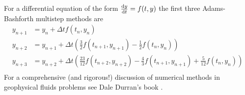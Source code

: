 \documentclass[a4paper]{tufte-handout}
\begin{document}
  For a differential equation of the form $ \frac{\operatorname{d}\!{} y}{\operatorname{d}\!{t}} = f(t, y) $ the
  first three Adams-Bashforth multistep methods are
  \begin{align*}
    y_{n+1} &= y_n + \Delta t f(t_n, y_n)  \\
    y_{n+2} &= y_{n+1} + \Delta t \left( \frac{3}{2}f(t_{n+1}, y_{n+1}) - \frac{1}{2}f(t_n, y_n) \right) \\
    y_{n+3} &= y_{n+2} + \Delta t \left( \frac{23}{12} f(t_{n+2}, y_{n+2}) - \frac{4}{3} f(t_{n+1}, y_{n+1}) + \frac{5}{12}f(t_n, y_n)\right) \\
  \end{align*}
  For a comprehensive (and rigorous!) discussion of numerical methods in
  geophysical fluids problems see Dale Durran's book \cite{Durran:2010hy}.




\end{document}
